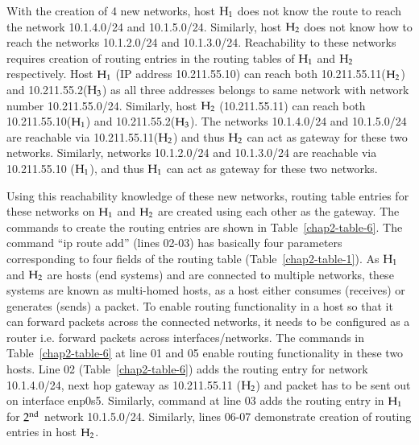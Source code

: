\begin{multicols}{2}
With the creation of 4 new networks, host ${\rm H}_{1}$ does not know the route to reach the network 10.1.4.0/24 and 10.1.5.0/24. Similarly, host ${\rm H}_{2}$ does not know how to reach the networks 10.1.2.0/24 and 10.1.3.0/24. Reachability to these networks requires creation of routing entries in the routing tables of ${\rm H}_{1}$ and ${\rm H}_{2}$ respectively. Host ${\rm H}_{1}$ (IP address 10.211.55.10) can reach both 10.211.55.11(${\rm H}_{2}$) and 10.211.55.2(${\rm H}_{3}$) as all three addresses belongs to same network with network number 10.211.55.0/24. Similarly, host ${\rm H}_{2}$ (10.211.55.11) can reach both 10.211.55.10(${\rm H}_{1}$) and 10.211.55.2(${\rm H}_{3}$). The networks 10.1.4.0/24 and 10.1.5.0/24 are reachable via 10.211.55.11(${\rm H}_{2}$) and thus ${\rm H}_{2}$ can act as gateway for these two networks. Similarly, networks 10.1.2.0/24 and 10.1.3.0/24 are reachable via 10.211.55.10 (${\rm H}_{1}$), and thus ${\rm H}_{1}$ can act as gateway for these two networks. 

Using this reachability knowledge of these new networks, routing table entries for these networks on ${\rm H}_{1}$ and ${\rm H}_{2}$ are created using each other as the gateway. The commands to create the routing entries are shown in Table~\ref{chap2-table-6}. The command “ip route add” (lines 02-03) has basically four parameters corresponding to four fields of the routing table (Table~\ref{chap2-table-1}). As ${\rm H}_{1}$ and ${\rm H}_{2}$ are hosts (end systems) and are connected to multiple networks, these systems are known as multi-homed hosts, as a host either consumes (receives) or generates (sends) a packet. To enable routing functionality in a host so that it can forward packets across the connected networks, it needs to be configured as a router i.e. forward packets across interfaces/networks. The commands in Table~\ref{chap2-table-6} at line 01 and 05 enable routing functionality in these two hosts. Line 02 (Table~\ref{chap2-table-6}) adds the routing entry for network 10.1.4.0/24, next hop gateway as 10.211.55.11 (${\rm H}_{2}$) and packet has to be sent out on interface enp0s5. Similarly, command at line 03 adds the routing entry in ${\rm H}_{1}$ for $2^{\rm nd}$ network 10.1.5.0/24. Similarly, lines 06-07 demonstrate creation of routing entries in host ${\rm H}_{2}$.


\end{multicols}
